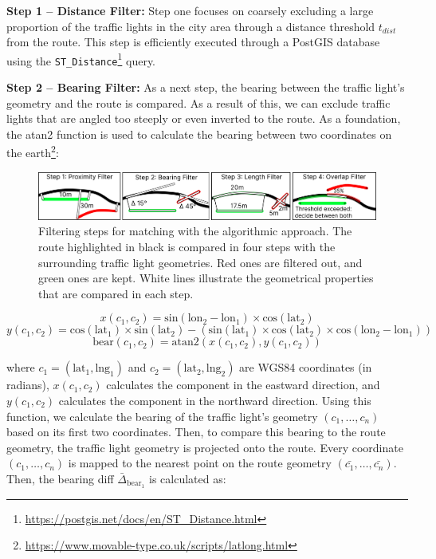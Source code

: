 \textbf{\color{cidarkblue}Step 1 -- Distance Filter:} Step one focuses on coarsely excluding a large proportion of the traffic lights in the city area through a distance threshold $t_{dist}$ from the route. This step is efficiently executed through a PostGIS database using the \texttt{ST\_Distance}\footnote{\url{https://postgis.net/docs/en/ST\_Distance.html}} query.

\textbf{\color{cidarkblue}Step 2 -- Bearing Filter:} As a next step, the bearing between the traffic light's geometry and the route is compared. As a result of this, we can exclude traffic lights that are angled too steeply or even inverted to the route. As a foundation, the atan2 function is used to calculate the bearing between two coordinates on the earth\footnote{\url{https://www.movable-type.co.uk/scripts/latlong.html}}:

\begin{figure}[t]
\centering
\includegraphics[width=\linewidth]{images/sg-matching-filters.pdf}
\caption{Filtering steps for matching with the algorithmic approach. The route highlighted in black is compared in four steps with the surrounding traffic light geometries. Red ones are filtered out, and green ones are kept. White lines illustrate the geometrical properties that are compared in each step.}
\label{fig:sg-matching-filters}
\end{figure}

\begin{equation}
x(c_1, c_2) = \text{sin}(\text{lon}_2 - \text{lon}_1) \times \text{cos}(\text{lat}_2)
\end{equation}
\begin{equation}
y(c_1, c_2) = \text{cos}(\text{lat}_1) \times \text{sin}(\text{lat}_2) - (\text{sin}(\text{lat}_1) \times \text{cos}(\text{lat}_2) \times \text{cos}(\text{lon}_2 - \text{lon}_1))
\end{equation}
\begin{equation}
\text{bear}(c_1, c_2) = \text{atan2}(x(c_1, c_2), y(c_1, c_2))
\end{equation}

where $c_1 = (\text{lat}_1, \text{lng}_1)$ and $c_2 = (\text{lat}_2, \text{lng}_2)$ are WGS84 coordinates (in radians), $x(c_1, c_2)$ calculates the component in the eastward direction, and $y(c_1, c_2)$ calculates the component in the northward direction. Using this function, we calculate the bearing of the traffic light's geometry $(c_1, \dots, c_n)$ based on its first two coordinates. Then, to compare this bearing to the route geometry, the traffic light geometry is projected onto the route. Every coordinate $(c_1, \dots, c_n)$ is mapped to the nearest point on the route geometry $(\bar{c_1}, \dots, \bar{c_n})$. Then, the bearing diff $\bar{\Delta}_{\text{bear}_1}$ is calculated as:

